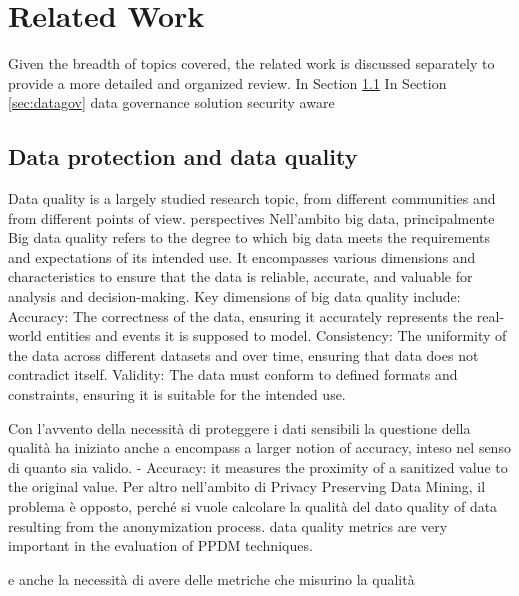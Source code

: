 \section{Related Work}\label{sec:related}


Given the breadth of topics covered, the related work is discussed separately to provide a more detailed and organized review.
In Section \ref{sec:dataquality} In Section \ref{sec:datagov} data governance solution security aware

\subsection{Data protection and data quality}\label{sec:dataquality}

Data quality is a largely studied research topic, from different communities and from different points of view. perspectives
Nell'ambito big data, principalmente Big data quality refers to the degree to which big data meets the requirements and expectations of its intended use. It encompasses various dimensions and characteristics to ensure that the data is reliable, accurate, and valuable for analysis and decision-making. Key dimensions of big data quality include:
    Accuracy: The correctness of the data, ensuring it accurately represents the real-world entities and events it is supposed to model.
    Consistency: The uniformity of the data across different datasets and over time, ensuring that data does not contradict itself.
    Validity: The data must conform to defined formats and constraints, ensuring it is suitable for the intended use.


Con l'avvento della necessità di proteggere i dati sensibili la questione della qualità ha iniziato anche a encompass a larger notion of accuracy, inteso nel senso di quanto sia valido. - Accuracy: it measures the proximity of a sanitized value to the original
value.
Per altro nell'ambito di Privacy Preserving Data Mining, il problema è opposto, perché si vuole calcolare la qualità del dato quality of data resulting from the anonymization process. data quality metrics are very important in the evaluation of PPDM
techniques.

e anche la necessità di avere delle metriche che misurino la qualità



